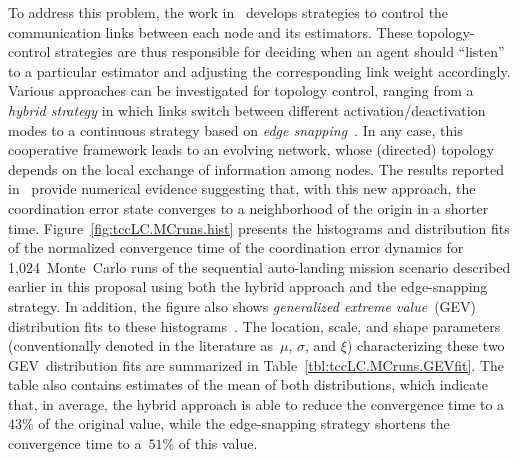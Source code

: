\documentclass[letter,onecolumn,12pt]{aiaa-tc}
\newcommand{\1}{1_n}
\begin{document}
To address this problem, the work in~\cite{XargayPhd} develops strategies to control the communication links between each node and its estimators. These topology-control strategies are thus responsible for deciding when an agent should ``listen'' to a particular estimator and adjusting the corresponding link weight accordingly. Various approaches can be investigated for topology control, ranging from a \emph{hybrid strategy} in which links switch between different activation/deactivation modes to a continuous strategy based on \emph{edge snapping}~\cite{TCS10_DeLellis,CHAOS11_DeLellis}. In any case, this cooperative framework leads to an evolving network, whose (directed) topology depends on the local exchange of information among nodes. The results reported in~\cite{XargayPhd} provide numerical evidence suggesting that, with this new approach, the coordination error state converges to a neighborhood of the origin in a shorter time. Figure~\ref{fig:tccLC.MCruns.hist} presents the histograms and distribution fits of the normalized convergence time of the coordination error dynamics for 1,024~Monte~Carlo runs of the sequential auto-landing mission scenario described earlier in this proposal using both the hybrid approach and the edge-snapping strategy. In addition, the figure also shows \emph{generalized extreme value}~(GEV) distribution fits to these histograms~\cite{GEVbook}. The location, scale, and shape parameters (conventionally denoted in the literature as~$\mu$, $\sigma$, and $\xi$) characterizing these two GEV~distribution fits are summarized in Table~\ref{tbl:tccLC.MCruns.GEVfit}. The table also contains estimates of the mean of both distributions, which indicate that, in average, the hybrid approach is able to reduce the convergence time to a~$43\%$ of the original value, while the edge-snapping strategy shortens the convergence time to a~$51\%$ of this value.
\end{document}
